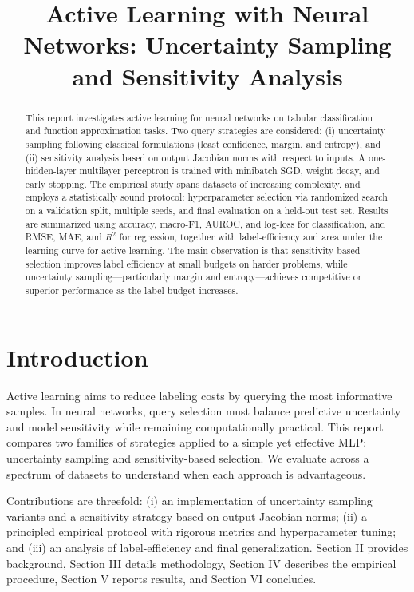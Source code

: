\documentclass[conference]{IEEEtran}
\title{Active Learning with Neural Networks: Uncertainty Sampling and Sensitivity Analysis}
\author{\IEEEauthorblockN{\nameinit\ \surname\ \, (\studentnumber)}
\IEEEauthorblockA{Stellenbosch University\\ Machine Learning 441\\ \emailaddr}}
\begin{document}
\maketitle

\begin{abstract}
This report investigates active learning for neural networks on tabular classification and function approximation tasks. Two query strategies are considered: (i) uncertainty sampling following classical formulations (least confidence, margin, and entropy), and (ii) sensitivity analysis based on output Jacobian norms with respect to inputs. A one-hidden-layer multilayer perceptron is trained with minibatch SGD, weight decay, and early stopping. The empirical study spans datasets of increasing complexity, and employs a statistically sound protocol: hyperparameter selection via randomized search on a validation split, multiple seeds, and final evaluation on a held-out test set. Results are summarized using accuracy, macro-F1, AUROC, and log-loss for classification, and RMSE, MAE, and $R^2$ for regression, together with label-efficiency and area under the learning curve for active learning. The main observation is that sensitivity-based selection improves label efficiency at small budgets on harder problems, while uncertainty sampling—particularly margin and entropy—achieves competitive or superior performance as the label budget increases.
\end{abstract}

\section{Introduction}
Active learning aims to reduce labeling costs by querying the most informative samples. In neural networks, query selection must balance predictive uncertainty and model sensitivity while remaining computationally practical. This report compares two families of strategies applied to a simple yet effective MLP: uncertainty sampling and sensitivity-based selection. We evaluate across a spectrum of datasets to understand when each approach is advantageous.

Contributions are threefold: (i) an implementation of uncertainty sampling variants and a sensitivity strategy based on output Jacobian norms; (ii) a principled empirical protocol with rigorous metrics and hyperparameter tuning; and (iii) an analysis of label-efficiency and final generalization. Section II provides background, Section III details methodology, Section IV describes the empirical procedure, Section V reports results, and Section VI concludes.
\end{document}

